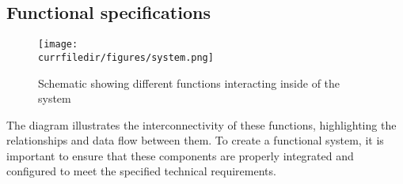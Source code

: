 \newpage

\subsection{Functional specifications}

\begin{figure}[!h]
    \centering
    \texttt{[image: \\currfiledir/figures/system.png]}
    \caption{Schematic showing different functions interacting inside of the system}
\end{figure}

The diagram illustrates the interconnectivity of these functions, highlighting the relationships and data flow between them. To create a functional system, it is important to ensure that these components are properly integrated and configured to meet the specified technical requirements.

